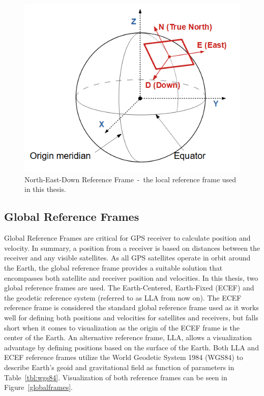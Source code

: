 \documentclass[12pt]{report}
\begin{document}
\begin{figure}[!ht]\label{fig:NEDframe}
  \centering
  \includegraphics[width=\linewidth]{Figures/nedframe.PNG}
  \caption{North-East-Down Reference Frame~-~the local reference frame used in this thesis.}
\end{figure}

\subsection{Global Reference Frames}
Global Reference Frames are critical for GPS receiver to calculate position and velocity. In summary, a position from a receiver is based on distances between the receiver and any visible satellites. As all GPS satellites operate in orbit around the Earth, the global reference frame provides a suitable solution that encompasses both satellite and receiver position and velocities. In this thesis, two global reference frames are used. The Earth-Centered, Earth-Fixed (ECEF) and the geodetic reference system (referred to as LLA from now on). The ECEF reference frame is considered the standard global reference frame used as it works well for defining both positions and velocities for satellites and receivers, but falls short when it comes to visualization as the origin of the ECEF frame is the center of the Earth. An alternative reference frame, LLA, allows a visualization advantage by defining positions based on the surface of the Earth. Both LLA and ECEF reference frames utilize the World Geodetic System 1984 (WGS84) to describe Earth's geoid and gravitational field as function of parameters in Table~\ref{tbl:wgs84}. Visualization of both reference frames can be seen in Figure~\ref{globalframes}.
\end{document}
